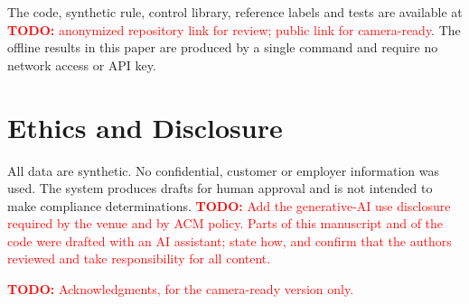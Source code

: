 \documentclass[sigconf,review,anonymous]{acmart}
\newcommand{\todo}[1]{\textcolor{red}{\textbf{TODO:} #1}}
\begin{document}
The code, synthetic rule, control library, reference labels and tests are
available at \todo{anonymized repository link for review; public link for
camera-ready}. The offline results in this paper are produced by a single
command and require no network access or API key.

\section*{Ethics and Disclosure}

All data are synthetic. No confidential, customer or employer information
was used. The system produces drafts for human approval and is not intended
to make compliance determinations.
\todo{Add the generative-AI use disclosure required by the venue and by ACM
policy. Parts of this manuscript and of the code were drafted with an AI
assistant; state how, and confirm that the authors reviewed and take
responsibility for all content.}

\begin{acks}
\todo{Acknowledgments, for the camera-ready version only.}
\end{acks}



\end{document}
